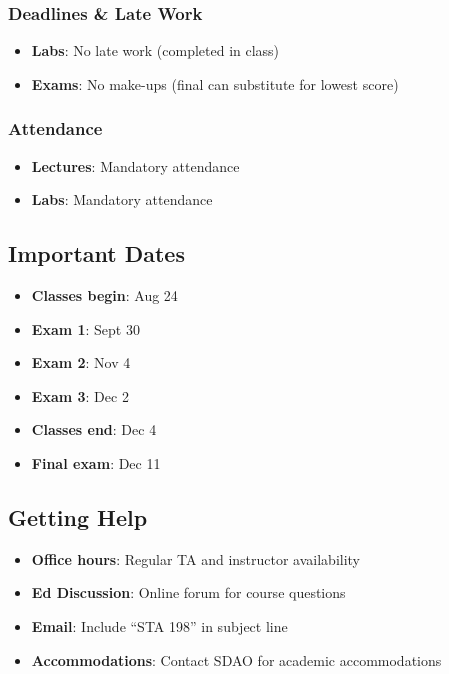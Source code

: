 \documentclass[
  letterpaper,
  DIV=11,
  numbers=noendperiod]{scrartcl}
\providecommand{\tightlist}{%
  \setlength{\itemsep}{0pt}\setlength{\parskip}{0pt}}
\begin{document}
\subsubsection{Deadlines \& Late Work}\label{deadlines-late-work}

\begin{itemize}
\tightlist
\item
  \textbf{Labs}: No late work (completed in class)
\item
  \textbf{Exams}: No make-ups (final can substitute for lowest score)
\end{itemize}

\subsubsection{Attendance}\label{attendance}

\begin{itemize}
\tightlist
\item
  \textbf{Lectures}: Mandatory attendance
\item
  \textbf{Labs}: Mandatory attendance
\end{itemize}

\subsection{Important Dates}\label{important-dates}

\begin{itemize}
\tightlist
\item
  \textbf{Classes begin}: Aug 24
\item
  \textbf{Exam 1}: Sept 30
\item
  \textbf{Exam 2}: Nov 4
\item
  \textbf{Exam 3}: Dec 2
\item
  \textbf{Classes end}: Dec 4
\item
  \textbf{Final exam}: Dec 11
\end{itemize}

\subsection{Getting Help}\label{getting-help}

\begin{itemize}
\tightlist
\item
  \textbf{Office hours}: Regular TA and instructor availability
\item
  \textbf{Ed Discussion}: Online forum for course questions
\item
  \textbf{Email}: Include ``STA 198'' in subject line
\item
  \textbf{Accommodations}: Contact SDAO for academic accommodations
\end{itemize}
\end{document}
